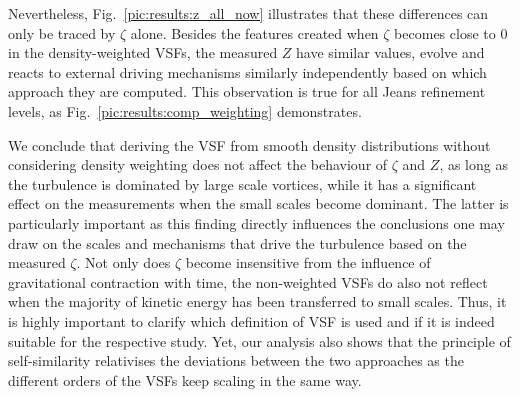 Nevertheless, Fig.~\ref{pic:results:z_all_now} illustrates that these differences can only be traced by $\zeta$ alone. 
Besides the features created when $\zeta$ becomes close to 0 in the density-weighted VSFs, the measured $Z$ have similar values, evolve and reacts to external driving mechanisms similarly independently based on which approach they are computed. 
This observation is true for all Jeans refinement levels, as Fig.~\ref{pic:results:comp_weighting} demonstrates.

We conclude that deriving the VSF from smooth density distributions without considering density weighting does not affect the behaviour of $\zeta$ and $Z$, as long as the turbulence is dominated by large scale vortices, while it has a significant effect on the measurements when the small scales become dominant.
The latter is particularly important as this finding directly influences the conclusions one may draw on the scales and mechanisms that drive the turbulence based on the measured $\zeta$.
Not only does $\zeta$ become insensitive from the influence of gravitational contraction with time, the non-weighted VSFs do also not reflect when the majority of kinetic energy has been transferred to small scales. 
Thus, it is highly important to clarify which definition of VSF is used and if it is indeed suitable for the respective study.
Yet, our analysis also shows that the principle of self-similarity relativises the deviations between the two approaches as the different orders of the VSFs keep scaling in the same way. 













